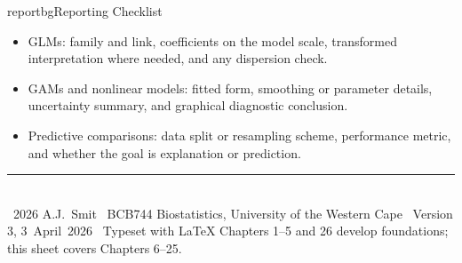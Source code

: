 \documentclass[9pt,landscape]{extarticle}
\newlength{\tableblockwidth}
\newlength{\tableoffset}
\begin{document}
\begin{minipage}{\tableblockwidth}
\begin{tcbraster}[
  raster columns=3,
  raster equal height=rows,
  raster column skip=4mm,
  raster left skip=0pt,
  raster right skip=0pt
]
\begin{infopanelbox}{reportbg}{Reporting Checklist}
\begin{itemize}[leftmargin=*, itemsep=2pt, topsep=2pt]
\item GLMs: family and link, coefficients on the model scale, transformed interpretation where needed, and any dispersion check.
\item GAMs and nonlinear models: fitted form, smoothing or parameter details, uncertainty summary, and graphical diagnostic conclusion.
\item Predictive comparisons: data split or resampling scheme, performance metric, and whether the goal is explanation or prediction.
\end{itemize}
\end{infopanelbox}
\end{tcbraster}
\end{minipage}

\vfill
\noindent\hspace*{\tableoffset}%
\begin{minipage}{\tableblockwidth}
  \rule{\tableblockwidth}{0.3pt}\\[2pt]
  {\scriptsize\color{notegrey}%
    \textcopyright\ 2026 A.J.\ Smit \textperiodcentered\
    BCB744 Biostatistics, University of the Western Cape \textperiodcentered\
    Version 3, \mbox{3 April 2026} \textperiodcentered\
    Typeset with \LaTeX%
    \hfill
    Chapters 1--5 and 26 develop foundations; this sheet covers Chapters 6--25.}
\end{minipage}
\end{document}

